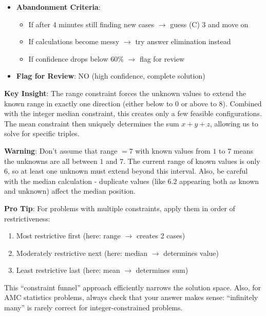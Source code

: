 \documentclass[11pt]{article}
\begin{document}
\begin{competitionbox}
\begin{itemize}[leftmargin=*]
    \item \textbf{Abandonment Criteria}: 
    \begin{itemize}
        \item If after 4 minutes still finding new cases $\rightarrow$ guess (C) 3 and move on
        \item If calculations become messy $\rightarrow$ try answer elimination instead
        \item If confidence drops below 60\% $\rightarrow$ flag for review
    \end{itemize}
    
    \item \textbf{Flag for Review}: NO (high confidence, complete solution)
\end{itemize}
\end{competitionbox}

\begin{keyinsightbox}
\textbf{Key Insight}: The range constraint forces the unknown values to extend the known range in exactly one direction (either below to $0$ or above to $8$). Combined with the integer median constraint, this creates only a few feasible configurations. The mean constraint then uniquely determines the sum $x + y + z$, allowing us to solve for specific triples.
\end{keyinsightbox}

\begin{warningbox}
\textbf{Warning}: Don't assume that range $= 7$ with known values from $1$ to $7$ means the unknowns are all between $1$ and $7$. The current range of known values is only $6$, so at least one unknown must extend beyond this interval. Also, be careful with the median calculation - duplicate values (like $6.2$ appearing both as known and unknown) affect the median position.
\end{warningbox}

\begin{tipbox}
\textbf{Pro Tip}: For problems with multiple constraints, apply them in order of restrictiveness:
\begin{enumerate}
    \item Most restrictive first (here: range $\rightarrow$ creates 2 cases)
    \item Moderately restrictive next (here: median $\rightarrow$ determines value)
    \item Least restrictive last (here: mean $\rightarrow$ determines sum)
\end{enumerate}
This ``constraint funnel'' approach efficiently narrows the solution space. Also, for AMC statistics problems, always check that your answer makes sense: ``infinitely many'' is rarely correct for integer-constrained problems.
\end{tipbox}
\end{document}
